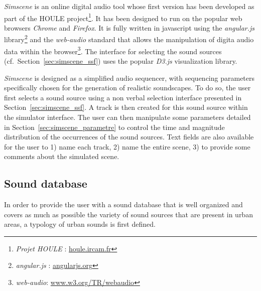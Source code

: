 \documentclass[preprint,12pt]{elsarticle}
\newcommand{\cf}{cf.}
\begin{document}
\emph{Simscene} is an online digital audio tool whose first version has been developed as part of the HOULE project\footnote{\emph{Projet HOULE} : \url{houle.ircam.fr}}. It has been designed to run on the popular web browsers \emph{Chrome} and \emph{Firefox}. It is fully written in javascript using the \emph{angular.js} library\footnote{\emph{angular.js} : \url{angularjs.org}} and the \emph{web-audio} standard that allows the manipulation of digita audio data within the browser\footnote{\emph{web-audio}: \url{www.w3.org/TR/webaudio}}. The interface for selecting the sound sources (\cf~Section~\ref{sec:simscene_ssf}) uses the popular \emph{D3.js} \cite{d32011} visualization library.


\emph{Simscene} is designed as a simplified audio sequencer, with sequencing parameters specifically chosen for the generation of realistic soundscapes. To do so, the user first selects a sound source using a non verbal selection interface presented in Section~\ref{sec:simscene_ssf}. A track is then created for this sound source within the simulator interface. The user can then manipulate some parameters detailed in Section~\ref{sec:simscene_parametre} to control the time and magnitude distribution of the occurrences of the sound sources. Text fields are also available for the user to 1) name each track, 2) name the entire scene, 3) to provide some comments about the simulated scene.

\subsection{Sound database}
\label{sec:simscene_sampleDataSet}

In order to provide the user with a sound database that is well organized and covers as much as possible the variety of sound sources that are present in urban areas, a typology of urban sounds is first defined.
\end{document}
